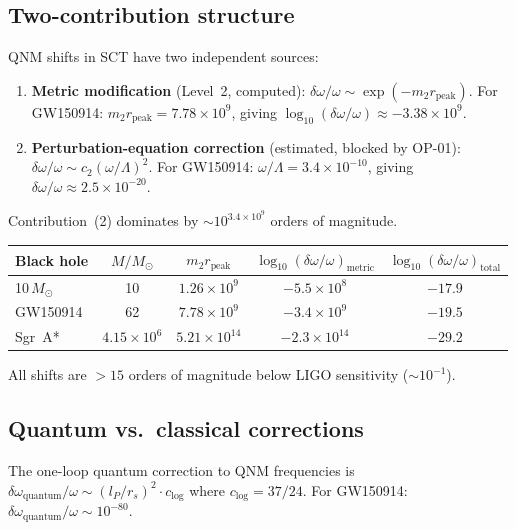 \documentclass[11pt,a4paper]{article}
\newcommand{\Msun}{M_\odot}
\begin{document}
\subsection{Two-contribution structure}

QNM shifts in SCT have two independent sources:

\begin{enumerate}
\item \textbf{Metric modification} (Level~2, computed):
$\delta\omega/\omega \sim \exp(-m_2 r_{\mathrm{peak}})$.
For GW150914: $m_2 r_{\mathrm{peak}} = 7.78 \times 10^9$, giving
$\log_{10}(\delta\omega/\omega) \approx -3.38 \times 10^9$.

\item \textbf{Perturbation-equation correction} (estimated, blocked by OP-01):
$\delta\omega/\omega \sim c_2(\omega/\Lambda)^2$.
For GW150914: $\omega/\Lambda = 3.4 \times 10^{-10}$, giving
$\delta\omega/\omega \approx 2.5 \times 10^{-20}$.
\end{enumerate}

Contribution~(2) dominates by $\sim 10^{3.4 \times 10^9}$ orders of magnitude.

\begin{center}
\begin{tabular}{lcccc}
\toprule
Black hole & $M/\Msun$ & $m_2 r_{\mathrm{peak}}$ &
$\log_{10}(\delta\omega/\omega)_{\mathrm{metric}}$ &
$\log_{10}(\delta\omega/\omega)_{\mathrm{total}}$ \\
\midrule
10\,$\Msun$ & 10 & $1.26 \times 10^9$ & $-5.5 \times 10^8$ & $-17.9$ \\
GW150914    & 62 & $7.78 \times 10^9$ & $-3.4 \times 10^9$ & $-19.5$ \\
Sgr~A*      & $4.15 \times 10^6$ & $5.21 \times 10^{14}$ & $-2.3 \times 10^{14}$ & $-29.2$ \\
\bottomrule
\end{tabular}
\end{center}

All shifts are $> 15$ orders of magnitude below LIGO sensitivity ($\sim 10^{-1}$).

\subsection{Quantum vs.\ classical corrections}

The one-loop quantum correction to QNM frequencies is
$\delta\omega_{\mathrm{quantum}}/\omega \sim (l_P/r_s)^2 \cdot c_{\log}$
where $c_{\log} = 37/24$. For GW150914:
$\delta\omega_{\mathrm{quantum}}/\omega \sim 10^{-80}$.
\end{document}
